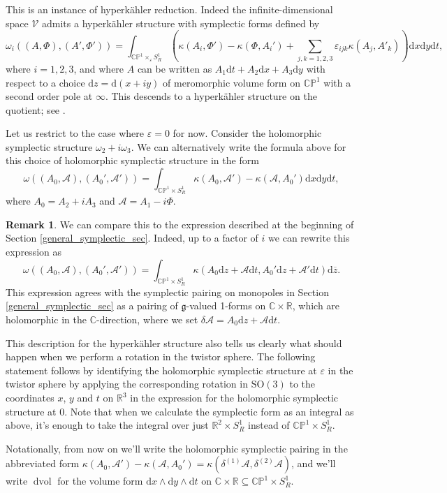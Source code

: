 \documentclass[11pt, oneside, reqno]{amsart}
\theoremstyle{definition} \newtheorem{definition}{Definition}[section]
\theoremstyle{definition} \newtheorem{remark}[definition]{Remark}
\theoremstyle{definition} \newtheorem{remarks}[definition]{Remarks}
\theoremstyle{definition} \newtheorem{question}[definition]{Question}
\theoremstyle{definition} \newtheorem*{note}{Note}
\theoremstyle{definition} \newtheorem{example}[definition]{Example}
\theoremstyle{definition} \newtheorem{examples}[definition]{Examples}
\renewcommand{\gg}{\mathfrak{g}}
\newcommand{\bb}[1]{\mathbb{#1}}
\newcommand{\mc}[1]{\mathcal{#1}}
\newcommand{\ol}[1]{\overline{#1}}
\newcommand{\CC}{\mathbb{C}}
\newcommand{\RR}{\mathbb{R}}
\newcommand{\eps}{\varepsilon}
\newcommand{\SO}{\mathrm{SO}}
\newcommand{\sub}{\subseteq}
\DeclareMathOperator{\dvol}{dvol}
\renewcommand{\d}{\mathrm{d}}
\begin{document}
This is an instance of hyperk\"ahler reduction.  Indeed the infinite-dimensional space $\mc V$ admits a hyperk\"ahler structure with symplectic forms defined by
\[\omega_i((A,\Phi),(A',\Phi')) = \int_{\bb{CP}^1 \times_\eps S^1_R} \left(\kappa(A_i,\Phi') - \kappa(\Phi, A_i') + \sum_{j,k=1,2,3} \eps_{ijk} \kappa(A_j,A'_k)\right) \d x \d y \d t, \]
where $i=1,2,3$, and where $A$ can be written as $A_1 \d t + A_2 \d x + A_3 \d y$ with respect to a choice $\d z = \d (x + iy)$ of meromorphic volume form on $\bb{CP}^1$ with a second order pole at $\infty$.  This descends to a hyperk\"ahler structure on the quotient; see \cite[Section 1.4.2]{FoscoloThesis}.

Let us restrict to the case where $\eps=0$ for now.  Consider the holomorphic symplectic structure $\omega_2 + i \omega_3$.  We can alternatively write the formula above for this choice of holomorphic symplectic structure in the form
\[\omega((A_0, \mc A), (A_0', \mc A')) = \int_{\bb{CP}^1 \times S^1_R} \kappa(A_0, \mc A') - \kappa(\mc A, A_0') \d x \d y \d t,\]
where $A_0 = A_2 + i A_3$ and $\mc A = A_1 - i \Phi$.  

\begin{remark}
We can compare this to the expression described at the beginning of Section \ref{general_symplectic_sec}. Indeed, up to a factor of $i$ we can rewrite this expression as
\[\omega((A_0, \mc A), (A_0', \mc A')) = \int_{\bb{CP}^1 \times S^1_R} \kappa(A_0\d z + \mc A \d t, A_0' \d z + \mc A' \d t) \d \ol{z}.\]
This expression agrees with the symplectic pairing on monopoles in Section \ref{general_symplectic_sec} as a pairing of $\gg$-valued 1-forms on $\CC \times \RR$, which are holomorphic in the $\CC$-direction, where we set $\delta \mc A = A_0\d z + \mc A \d t$.
\end{remark}

This description for the hyperk\"ahler structure also tells us clearly what should happen when we perform a rotation in the twistor sphere.  The following statement follows by identifying the holomorphic symplectic structure at $\eps$ in the twistor sphere by applying the corresponding rotation in $\SO(3)$ to the coordinates $x$, $y$ and $t$ on $\RR^3$ in the expression for the holomorphic symplectic structure at $0$.  Note that when we calculate the symplectic form as an integral as above, it's enough to take the integral over just $\RR^2 \times S^1_R$ instead of $\bb{CP}^1 \times S^1_R$.

Notationally, from now on we'll write the holomorphic symplectic pairing in the abbreviated form $\kappa(A_0, \mc A') - \kappa(\mc A, A_0') = \kappa(\delta^{(1)} \mc A, \delta^{(2)} \mc A)$, and we'll write $\dvol$ for the volume form $\d x \wedge \d y \wedge \d t$ on $\CC \times \RR \sub \bb{CP}^1 \times S^1_R$.
\end{document}
